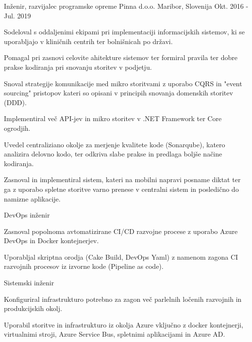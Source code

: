\begin{cventries}
  \cventry
    {Inženir, razvijalec programske opreme} %
    {Pinna d.o.o.} %
    {Maribor, Slovenija} %
    {Okt. 2016 - Jul. 2019} %
    {
      \begin{cvitems} %
        \item {Sodeloval s oddaljenimi ekipami pri implementaciji 
        informacijskih sistemov, ki se uporabljajo v kliničnih 
        centrih ter bolnišnicah po državi.}
        \item {Pomagal pri zasnovi celovite ahitekture sistemov ter 
        formiral pravila ter dobre prakse kodiranja pri snovanju storitev v podjetju.}
        \item {Snoval strategije komunikacije med mikro storitvami z uporabo 
        CQRS in "event sourcing" pristopov kateri so opisani v principih 
        snovanja domenskih storitev (DDD).}
        \item {Implementiral več API-jev in mikro storitev v .NET Framework 
        ter Core ogrodjih.}
        \item {Uvedel centraliziano okolje za merjenje kvalitete kode 
        (Sonarqube), katero analizira delovno kodo, ter odkriva slabe 
        prakse in predlaga boljše načine kodiranja.}
        \item {Zasnoval in implementiral sistem, kateri na mobilni
         napravi posname diktat ter ga z uporabo spletne storitve varno
          prenese v centralni sistem in posledično do namizne aplikacije.\\}
      \end{cvitems}
    }
    \cventry
    {DevOps inženir} %
    {} %
    {} %
    {} %
    {
      \begin{cvitems} %
        \item {Zasnoval popolnoma avtomatizirane CI/CD razvojne procese z 
        uporabo Azure DevOps in Docker kontejnerjev.}
        \item {Uporabljal skriptna orodja (Cake Build, DevOps Yaml) z
         namenom zagona CI razvojnih procesov iz izvorne kode (Pipeline as code).\\}
      \end{cvitems}
    }
    \cventry
    {Sistemski inženir} %
    {} %
    {} %
    {} %
    {
      \begin{cvitems} %
        \item {Konfiguriral infrastrukturo potrebno za zagon več
         parlelnih ločenih razvojnih in produkcijskih okolj.}
        \item {Uporabil storitve in infrastrukturo iz okolja Azure
         vključno z docker kontejnerji, virtualnimi stroji, Azure Service Bus,
          spletnimi aplikacijami in Azure AD.\\}
      \end{cvitems}
    }


\end{cventries}
